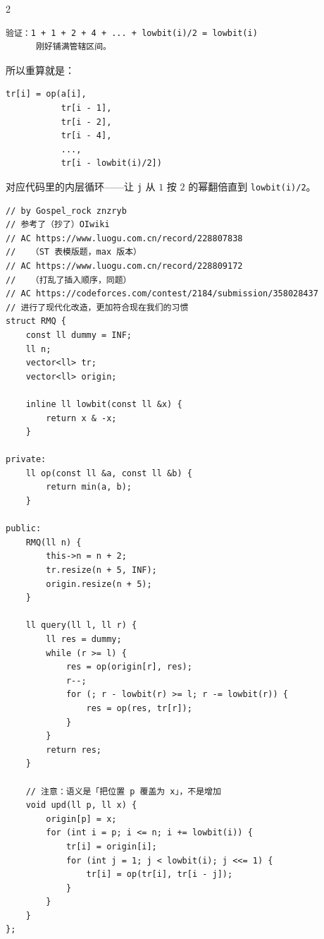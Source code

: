 \begin{multicols*}{2}
\begin{verbatim}
验证：1 + 1 + 2 + 4 + ... + lowbit(i)/2 = lowbit(i)
      刚好铺满管辖区间。
	\end{verbatim}

	所以重算就是：

	\begin{verbatim}
tr[i] = op(a[i],
           tr[i - 1],
           tr[i - 2],
           tr[i - 4],
           ...,
           tr[i - lowbit(i)/2])
	\end{verbatim}

	对应代码里的内层循环——让 \verb|j| 从 $1$ 按 $2$ 的幂翻倍直到 \verb|lowbit(i)/2|。



	\begin{verbatim}
// by Gospel_rock znzryb
// 参考了（抄了）OIwiki
// AC https://www.luogu.com.cn/record/228807838
//   （ST 表模版题，max 版本）
// AC https://www.luogu.com.cn/record/228809172
//   （打乱了插入顺序，同题）
// AC https://codeforces.com/contest/2184/submission/358028437
// 进行了现代化改造，更加符合现在我们的习惯
struct RMQ {
	const ll dummy = INF;
	ll n;
	vector<ll> tr;
	vector<ll> origin;

	inline ll lowbit(const ll &x) {
		return x & -x;
	}

private:
	ll op(const ll &a, const ll &b) {
		return min(a, b);
	}

public:
	RMQ(ll n) {
		this->n = n + 2;
		tr.resize(n + 5, INF);
		origin.resize(n + 5);
	}

	ll query(ll l, ll r) {
		ll res = dummy;
		while (r >= l) {
			res = op(origin[r], res);
			r--;
			for (; r - lowbit(r) >= l; r -= lowbit(r)) {
				res = op(res, tr[r]);
			}
		}
		return res;
	}

	// 注意：语义是「把位置 p 覆盖为 x」，不是增加
	void upd(ll p, ll x) {
		origin[p] = x;
		for (int i = p; i <= n; i += lowbit(i)) {
			tr[i] = origin[i];
			for (int j = 1; j < lowbit(i); j <<= 1) {
				tr[i] = op(tr[i], tr[i - j]);
			}
		}
	}
};
	\end{verbatim}


\end{multicols*}
